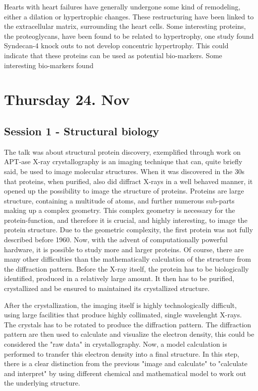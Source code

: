 \documentclass[12p]{article}
\begin{document}
Hearts with heart failures have generally undergone some kind of remodeling, either a dilation or hypertrophic changes.
These restructuring have been linked to the extracellular matrix, surrounding the heart cells.
Some interesting proteins, the proteoglycans, have been found to be related to hypertrophy, one study found Syndecan-4 knock outs to not develop concentric hypertrophy.
This could indicate that these proteins can be used as potential bio-markers.
Some interesting bio-markers found 

\section*{Thursday 24. Nov}

\subsection*{Session 1 - Structural biology}

The talk was about structural protein discovery, exemplified through work on APT-ase
X-ray crystallography is an imaging technique that can, quite briefly said, be used to image molecular structures.
When it was discovered in the 30s that proteins, when purified, also did diffract X-rays in a well behaved manner, it opened up the possibility to image the structure of proteins.
Proteins are large structure, containing a multitude of atoms, and further numerous sub-parts making up a complex geometry.
This complex geometry is necessary for the protein-function, and therefore it is crucial, and highly interesting, to image the protein structure.
Due to the geometric complexity, the first protein was not fully described before 1960.
Now, with the advent of computationally  powerful hardware, it is possible to study more and larger proteins.
Of course, there are many other difficulties than the mathematically calculation of the structure from the diffraction pattern.
Before the X-ray itself, the protein has to be biologically identified, produced in a relatively large amount.
It then has to be purified, crystallized and be ensured to maintained its crystallized structure.

After the crystallization, the imaging itself is highly technologically difficult, using large facilities that produce highly collimated, single wavelenght X-rays.
The crystals has to be rotated to produce the diffraction pattern.
The diffraction pattern are then used to calculate and visualize the electron density, this could be considered the "raw data" in crystallography.
Now, a model calculation is performed to transfer this electron density into a final structure.
In this step, there is a clear distinction from the previous "image and calculate" to "calculate and interpret" by using different chemical and mathematical model to work out the underlying structure.
\end{document}

